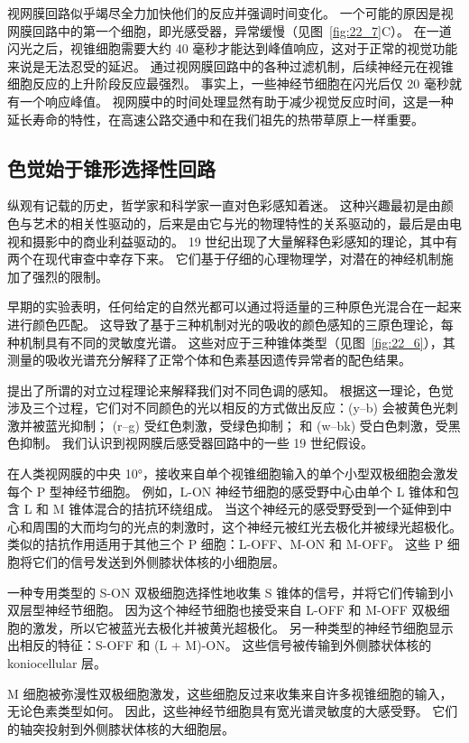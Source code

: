视网膜回路似乎竭尽全力加快他们的反应并强调时间变化。
一个可能的原因是视网膜回路中的第一个细胞，即光感受器，异常缓慢（见图~\ref{fig:22_7}C）。
在一道闪光之后，视锥细胞需要大约 40 毫秒才能达到峰值响应，这对于正常的视觉功能来说是无法忍受的延迟。
通过视网膜回路中的各种过滤机制，后续神经元在视锥细胞反应的上升阶段反应最强烈。
事实上，一些神经节细胞在闪光后仅 20 毫秒就有一个响应峰值。
视网膜中的时间处理显然有助于减少视觉反应时间，这是一种延长寿命的特性，在高速公路交通中和在我们祖先的热带草原上一样重要。



\subsection{色觉始于锥形选择性回路}

纵观有记载的历史，哲学家和科学家一直对色彩感知着迷。
这种兴趣最初是由颜色与艺术的相关性驱动的，后来是由它与光的物理特性的关系驱动的，最后是由电视和摄影中的商业利益驱动的。
19 世纪出现了大量解释色彩感知的理论，其中有两个在现代审查中幸存下来。
它们基于仔细的心理物理学，对潜在的神经机制施加了强烈的限制。


早期的实验表明，任何给定的自然光都可以通过将适量的三种原色光混合在一起来进行颜色匹配。
这导致了基于三种机制对光的吸收的颜色感知的三原色理论，每种机制具有不同的灵敏度光谱。
这些对应于三种锥体类型（见图~\ref{fig:22_6}），其测量的吸收光谱充分解释了正常个体和色素基因遗传异常者的配色结果。


提出了所谓的对立过程理论来解释我们对不同色调的感知。
根据这一理论，色觉涉及三个过程，它们对不同颜色的光以相反的方式做出反应：(y–b) 会被黄色光刺激并被蓝光抑制； (r–g) 受红色刺激，受绿色抑制；
和 (w–bk) 受白色刺激，受黑色抑制。
我们认识到视网膜后感受器回路中的一些 19 世纪假设。


在人类视网膜的中央 10°，接收来自单个视锥细胞输入的单个小型双极细胞会激发每个 P 型神经节细胞。
例如，L-ON 神经节细胞的感受野中心由单个 L 锥体和包含 L 和 M 锥体混合的拮抗环绕组成。
当这个神经元的感受野受到一个延伸到中心和周围的大而均匀的光点的刺激时，这个神经元被红光去极化并被绿光超极化。
类似的拮抗作用适用于其他三个 P 细胞：L-OFF、M-ON 和 M-OFF。
这些 P 细胞将它们的信号发送到外侧膝状体核的小细胞层。


一种专用类型的 S-ON 双极细胞选择性地收集 S 锥体的信号，并将它们传输到小双层型神经节细胞。
因为这个神经节细胞也接受来自 L-OFF 和 M-OFF 双极细胞的激发，所以它被蓝光去极化并被黄光超极化。
另一种类型的神经节细胞显示出相反的特征：S-OFF 和 (L + M)-ON。
这些信号被传输到外侧膝状体核的 koniocellular 层。


M 细胞被弥漫性双极细胞激发，这些细胞反过来收集来自许多视锥细胞的输入，无论色素类型如何。
因此，这些神经节细胞具有宽光谱灵敏度的大感受野。
它们的轴突投射到外侧膝状体核的大细胞层。


